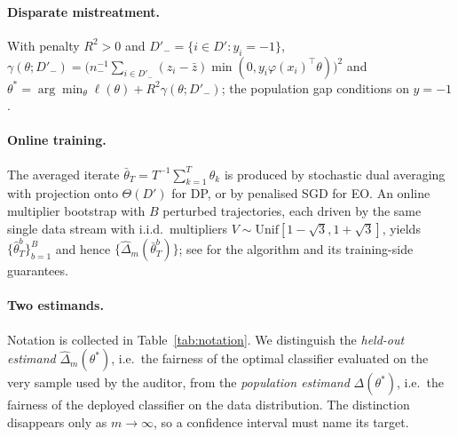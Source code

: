 \documentclass[11pt]{article}
\newcommand{\dhat}{\hat\Delta}
\newcommand{\tbar}{\bar\theta}
\newcommand{\Dp}{D'}
\begin{document}
\paragraph{Disparate mistreatment.} With penalty $R^2>0$ and $\Dp_-=\{i\in\Dp:y_i=-1\}$,
$\gamma(\theta;\Dp_-)=\big(n_-^{-1}\sum_{i\in\Dp_-}(z_i-\bar z)\min(0,y_i\varphi(x_i)^\top
\theta)\big)^2$ and $\theta^*=\arg\min_\theta \ell(\theta)+R^2\gamma(\theta;\Dp_-)$; the population
gap conditions on $y=-1$.

\paragraph{Online training.} The averaged iterate $\tbar_T=T^{-1}\sum_{k=1}^T\theta_k$ is produced by
stochastic dual averaging with projection onto $\Theta(\Dp)$ for DP, or by penalised SGD for EO.  An
online multiplier bootstrap with $B$ perturbed trajectories, each driven by the same single data
stream with i.i.d.\ multipliers $V\sim\mathrm{Unif}[1-\sqrt3,1+\sqrt3]$, yields
$\{\hat\theta^b_T\}_{b=1}^B$ and hence $\{\dhat_m(\bar\theta^b_T)\}$; see \citet{roy2026uq} for the
algorithm and its training-side guarantees.

\paragraph{Two estimands.} Notation is collected in Table~\ref{tab:notation}.  We distinguish the \emph{held-out estimand} $\dhat_m(\theta^*)$, i.e.\ the
fairness of the optimal classifier evaluated on the very sample used by the auditor, from the
\emph{population estimand} $\Delta(\theta^*)$, i.e.\ the fairness of the deployed classifier on the
data distribution.  The distinction disappears only as $m\to\infty$, so a confidence interval must name its target.
\end{document}
